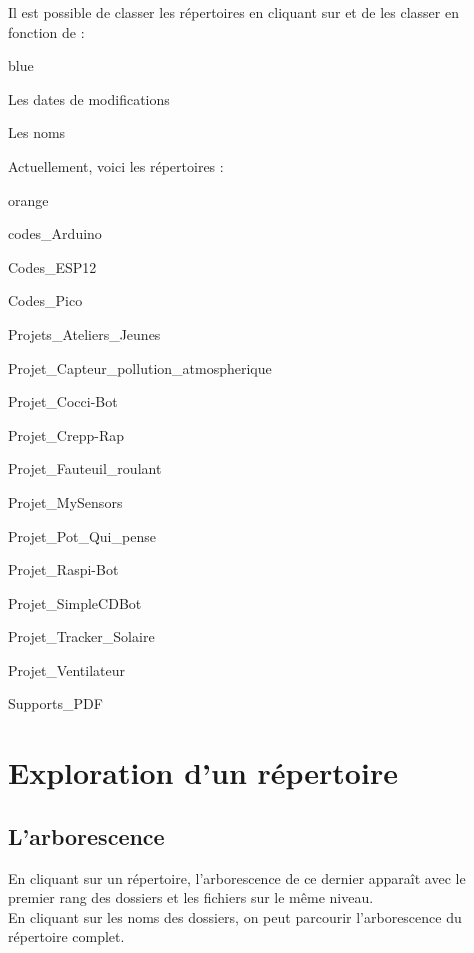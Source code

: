 
Il est possible de classer les répertoires en cliquant sur  et de les classer en fonction de :

\begin{items}{blue}{\Bullet}
    \item Les dates de modifications
    \item Les noms
\end{items}


Actuellement, voici les répertoires : 

\begin{items}{orange}{\faBookmark} 
\item codes\_Arduino
\item Codes\_ESP12
\item Codes\_Pico
\item Projets\_Ateliers\_Jeunes
\item Projet\_Capteur\_pollution\_atmospherique
\item Projet\_Cocci-Bot
\item Projet\_Crepp-Rap
\item Projet\_Fauteuil\_roulant
\item Projet\_MySensors
\item Projet\_Pot\_Qui\_pense
\item Projet\_Raspi-Bot
\item Projet\_SimpleCDBot
\item Projet\_Tracker\_Solaire
\item Projet\_Ventilateur
\item Supports\_PDF 
\end{items}


\section{Exploration d'un répertoire}

\subsection{L'arborescence}

En cliquant sur un répertoire, l'arborescence de ce dernier apparaît avec le premier rang des dossiers et les fichiers sur le même niveau.\\
En cliquant sur les noms des dossiers, on peut parcourir l'arborescence du répertoire complet.\\

